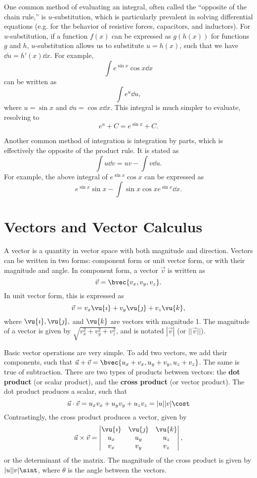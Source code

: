\documentclass[11pt]{article}
\begin{document}
One common method of evaluating an integral, often called the ``opposite of the chain rule,'' is $u$-substitution, which is particularly prevalent in solving differential equations (e.g. for the behavior of resistive forces, capacitors, and inductors). For $u$-substitution, if a function $f(x)$ can be expressed as $g(h(x))$ for functions $g$ and $h$, $u$-substitution allows us to substitute $u = h(x)$, such that we have $\dd u = h'(x) \dd x$. For example,
\[\int e^{\sin x}\cos x \dd x\]
can be written as
\[\int e^u\dd u,\]
where $u = \sin x$ and $\dd u = \cos x\dd x$. This integral is much simpler to evaluate, resolving to
\[e^{u} + C = e^{\sin x} + C.\]

Another common method of integration is integration by parts, which is effectively the opposite of the product rule. It is stated as
\begin{equation}
    \int u\dd v = uv - \int v\dd u.
\end{equation}
For example, the above integral of $e^{\sin x} \cos x$ can be expressed as
\[e^{\sin x}\sin x - \int \sin x\cos x e^{\sin x} \dd x.\]

\section{Vectors and Vector Calculus}
A vector is a quantity in vector space with both magnitude and direction. Vectors can be written in two forms: component form or unit vector form, or with their magnitude and angle. In component form, a vector $\vec{v}$ is written as \[\vec{v} = \bvec{v_x, v_y, v_z}.\] In unit vector form, this is expressed as \[\vec{v} = v_x\vu{\imath} + v_y\vu{\jmath} + v_z\vu{k},\] where $\vu{\imath}, \vu{\jmath},$ and $\vu{k}$ are vectors with magnitude 1.  The magnitude of a vector is given by $\sqrt{v_x^2+v_y^2+v_z^2}$, and is notated $|\vec{v}|$ (or $||\vec{v}||$).

Basic vector operations are very simple. To add two vectors, we add their components, such that $\vec{u} + \vec{v} = \bvec{u_x + v_x, u_y + v_y, u_z + v_z}$. The same is true of subtraction. There are two types of products between vectors: the \textbf{dot product} (or scalar product), and the \textbf{cross product} (or vector product). The dot product produces a scalar, such that
\begin{equation}
    \vec{u} \cdot \vec{v} = u_xv_x + u_yv_y + u_zv_z = |u||v|\cost
\end{equation}
Contrastingly, the cross product produces a vector, given by
\begin{equation}
    \vec{u} \times \vec{v} = \begin{vmatrix}
        \vu{\imath} & \vu{\jmath} & \vu{k} \\
        u_x & u_y & u_z \\
        v_x & v_y & v_z
    \end{vmatrix},
\end{equation}
or the determinant of the matrix. The magnitude of the cross product is given by $|u||v|\sint$, where $\theta$ is the angle between the vectors.
\end{document}
